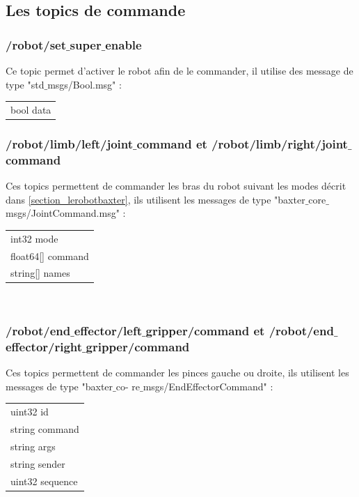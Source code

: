 \documentclass[a4paper,french, titlepage]{book}
\begin{document}
\subsection{Les topics de commande}

\subsubsection{/robot/set$\_$super$\_$enable}

Ce topic permet d'activer le robot afin de le commander, il utilise des message de type "std$\_$msgs/Bool.msg" :\\

\begin{tabular}{l}
bool data\\
\end{tabular}

\subsubsection{/robot/limb/left/joint$\_$command et /robot/limb/right/joint$\_$command}

Ces topics permettent de commander les bras du robot suivant les modes décrit dans \ref{section_lerobotbaxter}, ils utilisent les messages de type "baxter$\_$core$\_$msgs/JointCommand.msg" :\\

\begin{tabular}{l}
int32 mode\\
float64[] command\\
string[] names\\
\end{tabular}\\

\subsubsection{/robot/end$\_$effector/left$\_$gripper/command et /robot/end$\_$effector/right$\_$gripper/command}

Ces topics permettent de commander les pinces gauche ou droite, ils utilisent les messages de type "baxter$\_$co-
re$\_$msgs/EndEffectorCommand" : \\

\begin{tabular}{l}
uint32 id\\      
string command \\ 
string args  \\   
string sender \\  
uint32 sequence\\
\end{tabular}\\
\end{document}
